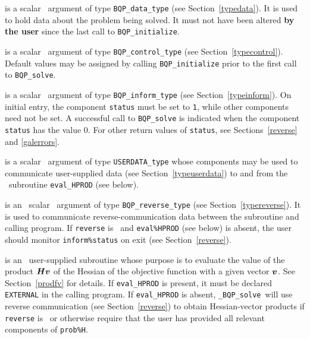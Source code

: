 \documentclass{galahad}
\newcommand{\packagename}{BQP}
\newcommand{\fullpackagename}{\libraryname\_\packagename}
\newcommand{\solver}{{\tt \fullpackagename\_solve}}
\begin{document}
\begin{description}
 is a scalar \intentinout\ argument of type 
{\tt \packagename\_data\_type}
(see Section~\ref{typedata}). It is used to hold data about the problem being 
solved. It must not have been altered {\bf by the user} since the last call to 
{\tt \packagename\_initialize}.

 is a scalar \intentin\ argument of type 
{\tt \packagename\_control\_type}
(see Section~\ref{typecontrol}). Default values may be assigned by calling 
{\tt \packagename\_initialize} prior to the first call to 
{\tt \packagename\_solve}.

 is a scalar \intentinout\ argument of type 
{\tt \packagename\_inform\_type}
(see Section~\ref{typeinform}). On initial entry, the component {\tt status}
must be set to {\tt 1}, while other components need not be set.
A successful call to
{\tt \packagename\_solve}
is indicated when the  component {\tt status} has the value 0. 
For other return values of {\tt status}, see Sections~\ref{reverse} and 
\ref{galerrors}.

 is a scalar \intentinout\ argument of type 
{\tt USERDATA\_type} whose components may be used
to communicate user-supplied data 
(see Section~\ref{typeuserdata})
to and from the \optional\ subroutine
 {\tt eval\_HPROD} (see below).

 is an \optional\ scalar \intentinout\ argument of type 
{\tt \packagename\_reverse\_type}
(see Section~\ref{typereverse}). 
It is used to communicate reverse-communication data between the 
subroutine and calling program.
If {\tt reverse} is \present\ and {\tt eval\%HPROD} (see below) is
absent, the user should monitor {\tt inform\%status} on exit
(see Section~\ref{reverse}).

 is an \optional\ 
user-supplied subroutine whose purpose is to evaluate the value of the 
product ${\bm{H}} {\bm{v}}$ of the Hessian of the objective function 
with a given vector ${\bm{v}}$.
See Section~\ref{prodfv} for details.
If {\tt eval\_HPROD} is present, 
it must be declared {\tt EXTERNAL} in the calling program.
If {\tt eval\_HPROD} is absent, \solver\ will use reverse communication 
(see Section~\ref{reverse}) 
to obtain Hessian-vector products if {\tt reverse} is \present\ or
otherwise require that the user has provided all relevant
components of {\tt prob\%H}.

\end{description}

\end{document}
